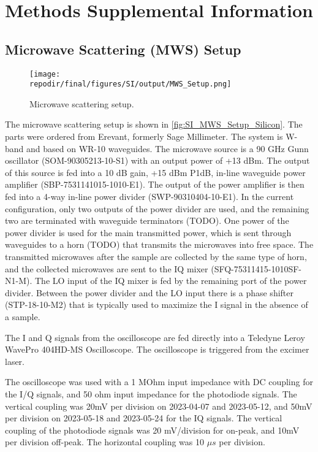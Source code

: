 \section{Methods Supplemental Information}

\subsection{Microwave Scattering (MWS) Setup}

\begin{figure}[]
\centering
\texttt{[image: \\repodir/final/figures/SI/output/MWS\_Setup.png]}
\caption{Microwave scattering setup.}
\label{fig:SI_MWS_Setup}
\end{figure}

The microwave scattering setup is shown in \ref{fig:SI_MWS_Setup_Silicon}. The parts were ordered from Erevant, formerly Sage Millimeter. The system is W-band and based on WR-10 waveguides. The microwave source is a 90 GHz Gunn oscillator (SOM-90305213-10-S1) with an output power of +13 dBm. The output of this source is fed into a 10 dB gain, +15 dBm P1dB, in-line waveguide power amplifier (SBP-7531141015-1010-E1). The output of the power amplifier is then fed into a 4-way in-line power divider (SWP-90310404-10-E1). In the current configuration, only two outputs of the power divider are used, and the remaining two are terminated with waveguide terminators (TODO). One power of the power divider is used for the main transmitted power, which is sent through waveguides to a horn (TODO) that transmits the microwaves into free space. The transmitted microwaves after the sample are collected by the same type of horn, and the collected microwaves are sent to the IQ mixer (SFQ-75311415-1010SF-N1-M). The LO input of the IQ mixer is fed by the remaining port of the power divider. Between the power divider and the LO input there is a phase shifter (STP-18-10-M2) that is typically used to maximize the I signal in the absence of a sample. 

The I and Q signals from the oscilloscope are fed directly into a Teledyne Leroy WavePro 404HD-MS Oscilloscope.  The oscilloscope is triggered from the excimer laser. 

The oscilloscope was used with a 1 MOhm input impedance with DC coupling for the I/Q signals, and 50 ohm input impedance for the photodiode signals. The vertical coupling was 20mV per division on 2023-04-07 and 2023-05-12, and 50mV per division on 2023-05-18 and 2023-05-24 for the IQ signals. The vertical coupling of the photodiode signals was 20 mV/division for on-peak, and 10mV per division off-peak. The horizontal coupling was 10 $\mu s$ per division. 

